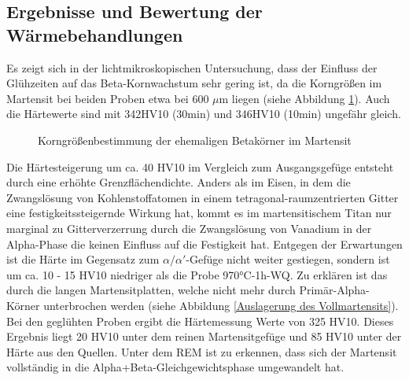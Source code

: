 \documentclass[a4paper, 11pt]{tubsreprt}
\begin{document}
\subsection{Ergebnisse und Bewertung der Wärmebehandlungen}
Es zeigt sich in der lichtmikroskopischen Untersuchung, dass der Einfluss der Glühzeiten auf das Beta-Kornwachstum sehr gering ist, da die Korngrößen im Martensit bei beiden Proben etwa bei 600 $\mu$m liegen (siehe Abbildung \ref{Korngroessenbestimmung Martensit}). Auch die Härtewerte sind mit 342HV10 (30min) und 346HV10 (10min) ungefähr gleich. 


\begin{figure}
\caption{Korngrößenbestimmung der ehemaligen Betakörner im Martensit}
\label{Korngroessenbestimmung Martensit}
\end{figure}


Die Härtesteigerung um ca. 40 HV10 im Vergleich zum Ausgangsgefüge entsteht durch eine erhöhte Grenzflächendichte. Anders als im Eisen, in dem die Zwangslösung von Kohlenstoffatomen in einem tetragonal-raumzentrierten Gitter eine festigkeitssteigernde Wirkung hat, kommt es im martensitischem Titan nur marginal zu Gitterverzerrung durch die Zwangslösung von Vanadium in der Alpha-Phase die keinen Einfluss auf die Festigkeit hat. Entgegen der Erwartungen ist die Härte im Gegensatz zum $\alpha/\alpha'$-Gefüge nicht weiter gestiegen, sondern ist um ca. 10 - 15 HV10 niedriger als die Probe 970°C-1h-WQ. Zu erklären ist das durch die langen Martensitplatten, welche nicht mehr durch Primär-Alpha-Körner unterbrochen werden (siehe Abbildung \ref{Auslagerung des Vollmartensits}).
Bei den geglühten Proben ergibt die Härtemessung Werte von 325 HV10. Dieses Ergebnis liegt 20 HV10 unter dem reinen Martensitgefüge und 85 HV10 unter der Härte aus den Quellen. Unter dem REM ist zu erkennen, dass sich der Martensit vollständig in die Alpha+Beta-Gleichgewichtsphase umgewandelt hat. 
\end{document}
